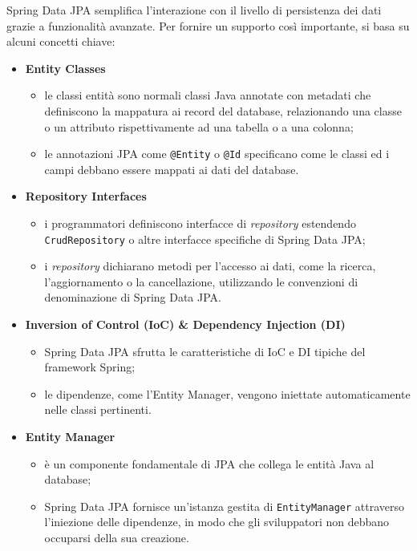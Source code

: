 Spring Data JPA semplifica l'interazione con il livello di persistenza dei dati grazie a funzionalità avanzate. Per fornire un supporto così importante, si basa su alcuni concetti chiave:
\begin{itemize}
    \item \textbf{Entity Classes}
    \begin{itemize}
        \item le classi entità sono normali classi Java annotate con metadati che definiscono la mappatura ai record del database, relazionando una classe o un attributo rispettivamente ad una tabella o a una colonna;
        \item le annotazioni JPA come \texttt{@Entity} o \texttt{@Id} specificano come le classi ed i campi debbano essere mappati ai dati del database.\cite{SPRINGDATA_baeldung2}
    \end{itemize}

    \item \textbf{Repository Interfaces}
    \begin{itemize}
        \item i programmatori definiscono interfacce di \textit{repository} estendendo \texttt{CrudRepository} o altre interfacce specifiche di Spring Data JPA;
        \item i \textit{repository} dichiarano metodi per l’accesso ai dati, come la ricerca, l’aggiornamento o la cancellazione, utilizzando le convenzioni di denominazione di Spring Data JPA.\cite{SPRINGDATA_baeldung3}
    \end{itemize}

    \item \textbf{Inversion of Control (IoC) \& Dependency Injection (DI)}
    \begin{itemize}
        \item Spring Data JPA sfrutta le caratteristiche di IoC e DI tipiche del framework Spring;
        \item le dipendenze, come l’Entity Manager, vengono iniettate automaticamente nelle classi pertinenti.
    \end{itemize}

    \item \textbf{Entity Manager}
    \begin{itemize}
        \item è un componente fondamentale di JPA che collega le entità Java al database;
        \item Spring Data JPA fornisce un’istanza gestita di \texttt{EntityManager} attraverso l’iniezione delle dipendenze, in modo che gli sviluppatori non debbano occuparsi della sua creazione.\cite{SPRINGDATA_baeldung4}
    \end{itemize}


\end{itemize}
